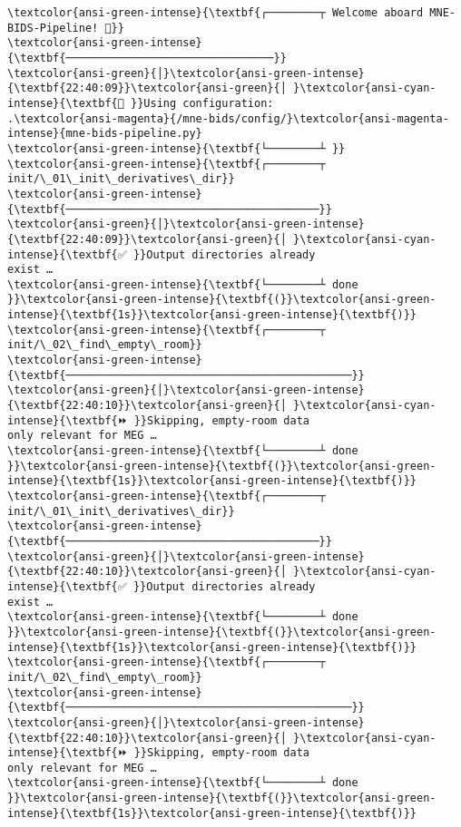 \documentclass[11pt]{article}
\begin{document}
    \begin{Verbatim}[commandchars=\\\{\}]
\textcolor{ansi-green-intense}{\textbf{┌────────┬ Welcome aboard MNE-BIDS-Pipeline! 👋}}
\textcolor{ansi-green-intense}{\textbf{────────────────────────────────}}
\textcolor{ansi-green}{│}\textcolor{ansi-green-intense}{\textbf{22:40:09}}\textcolor{ansi-green}{│ }\textcolor{ansi-cyan-intense}{\textbf{📝 }}Using configuration:
.\textcolor{ansi-magenta}{/mne-bids/config/}\textcolor{ansi-magenta-intense}{mne-bids-pipeline.py}
\textcolor{ansi-green-intense}{\textbf{└────────┴ }}
\textcolor{ansi-green-intense}{\textbf{┌────────┬ init/\_01\_init\_derivatives\_dir}}
\textcolor{ansi-green-intense}{\textbf{───────────────────────────────────────}}
\textcolor{ansi-green}{│}\textcolor{ansi-green-intense}{\textbf{22:40:09}}\textcolor{ansi-green}{│ }\textcolor{ansi-cyan-intense}{\textbf{✅ }}Output directories already
exist …
\textcolor{ansi-green-intense}{\textbf{└────────┴ done }}\textcolor{ansi-green-intense}{\textbf{(}}\textcolor{ansi-green-intense}{\textbf{1s}}\textcolor{ansi-green-intense}{\textbf{)}}
\textcolor{ansi-green-intense}{\textbf{┌────────┬ init/\_02\_find\_empty\_room}}
\textcolor{ansi-green-intense}{\textbf{────────────────────────────────────────────}}
\textcolor{ansi-green}{│}\textcolor{ansi-green-intense}{\textbf{22:40:10}}\textcolor{ansi-green}{│ }\textcolor{ansi-cyan-intense}{\textbf{⏩ }}Skipping, empty-room data
only relevant for MEG …
\textcolor{ansi-green-intense}{\textbf{└────────┴ done }}\textcolor{ansi-green-intense}{\textbf{(}}\textcolor{ansi-green-intense}{\textbf{1s}}\textcolor{ansi-green-intense}{\textbf{)}}
\textcolor{ansi-green-intense}{\textbf{┌────────┬ init/\_01\_init\_derivatives\_dir}}
\textcolor{ansi-green-intense}{\textbf{───────────────────────────────────────}}
\textcolor{ansi-green}{│}\textcolor{ansi-green-intense}{\textbf{22:40:10}}\textcolor{ansi-green}{│ }\textcolor{ansi-cyan-intense}{\textbf{✅ }}Output directories already
exist …
\textcolor{ansi-green-intense}{\textbf{└────────┴ done }}\textcolor{ansi-green-intense}{\textbf{(}}\textcolor{ansi-green-intense}{\textbf{1s}}\textcolor{ansi-green-intense}{\textbf{)}}
\textcolor{ansi-green-intense}{\textbf{┌────────┬ init/\_02\_find\_empty\_room}}
\textcolor{ansi-green-intense}{\textbf{────────────────────────────────────────────}}
\textcolor{ansi-green}{│}\textcolor{ansi-green-intense}{\textbf{22:40:10}}\textcolor{ansi-green}{│ }\textcolor{ansi-cyan-intense}{\textbf{⏩ }}Skipping, empty-room data
only relevant for MEG …
\textcolor{ansi-green-intense}{\textbf{└────────┴ done }}\textcolor{ansi-green-intense}{\textbf{(}}\textcolor{ansi-green-intense}{\textbf{1s}}\textcolor{ansi-green-intense}{\textbf{)}}
    \end{Verbatim}
\end{document}
